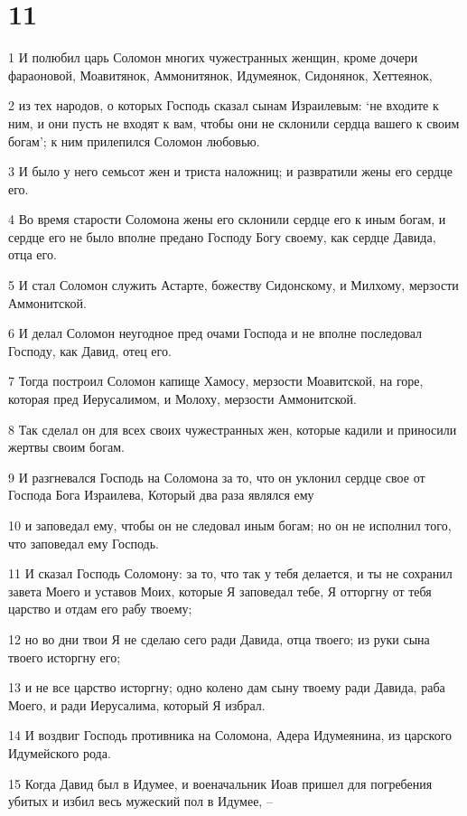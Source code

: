 \chapter{11}

\par 1 И полюбил царь Соломон многих чужестранных женщин, кроме дочери фараоновой, Моавитянок, Аммонитянок, Идумеянок, Сидонянок, Хеттеянок,
\par 2 из тех народов, о которых Господь сказал сынам Израилевым: `не входите к ним, и они пусть не входят к вам, чтобы они не склонили сердца вашего к своим богам'; к ним прилепился Соломон любовью.
\par 3 И было у него семьсот жен и триста наложниц; и развратили жены его сердце его.
\par 4 Во время старости Соломона жены его склонили сердце его к иным богам, и сердце его не было вполне предано Господу Богу своему, как сердце Давида, отца его.
\par 5 И стал Соломон служить Астарте, божеству Сидонскому, и Милхому, мерзости Аммонитской.
\par 6 И делал Соломон неугодное пред очами Господа и не вполне последовал Господу, как Давид, отец его.
\par 7 Тогда построил Соломон капище Хамосу, мерзости Моавитской, на горе, которая пред Иерусалимом, и Молоху, мерзости Аммонитской.
\par 8 Так сделал он для всех своих чужестранных жен, которые кадили и приносили жертвы своим богам.
\par 9 И разгневался Господь на Соломона за то, что он уклонил сердце свое от Господа Бога Израилева, Который два раза являлся ему
\par 10 и заповедал ему, чтобы он не следовал иным богам; но он не исполнил того, что заповедал ему Господь.
\par 11 И сказал Господь Соломону: за то, что так у тебя делается, и ты не сохранил завета Моего и уставов Моих, которые Я заповедал тебе, Я отторгну от тебя царство и отдам его рабу твоему;
\par 12 но во дни твои Я не сделаю сего ради Давида, отца твоего; из руки сына твоего исторгну его;
\par 13 и не все царство исторгну; одно колено дам сыну твоему ради Давида, раба Моего, и ради Иерусалима, который Я избрал.
\par 14 И воздвиг Господь противника на Соломона, Адера Идумеянина, из царского Идумейского рода.
\par 15 Когда Давид был в Идумее, и военачальник Иоав пришел для погребения убитых и избил весь мужеский пол в Идумее, --
